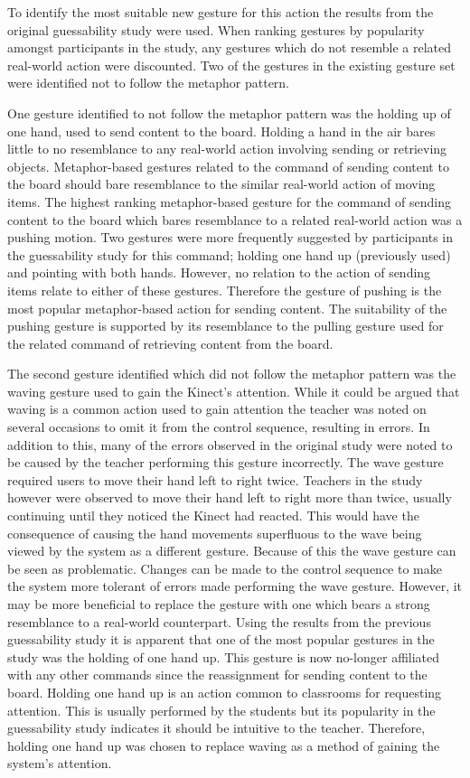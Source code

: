 \documentclass[manuscript, review, screen]{acmart}
\begin{document}
To identify the most suitable new gesture for this action the results from the original guessability study were used.
When ranking gestures by popularity amongst participants in the study, any gestures which do not resemble a related real-world action were discounted.
Two of the gestures in the existing gesture set were identified not to follow the metaphor pattern.

One gesture identified to not follow the metaphor pattern was the holding up of one hand, used to send content to the board.
Holding a hand in the air bares little to no resemblance to any real-world action involving sending or retrieving objects.
Metaphor-based gestures related to the command of sending content to the board should bare resemblance to the similar real-world action of moving items.
The highest ranking metaphor-based gesture for the command of sending content to the board which bares resemblance to a related real-world action was a pushing motion.
Two gestures were more frequently suggested by participants in the guessability study for this command; holding one hand up (previously used) and pointing with both hands.
However, no relation to the action of sending items relate to either of these gestures.
Therefore the gesture of pushing is the most popular metaphor-based action for sending content.
The suitability of the pushing gesture is supported by its resemblance to the pulling gesture used for the related command of retrieving content from the board.

The second gesture identified which did not follow the metaphor pattern was the waving gesture used to gain the Kinect's attention.
While it could be argued that waving is a common action used to gain attention the teacher was noted on several occasions to omit it from the control sequence, resulting in errors.
In addition to this, many of the errors observed in the original study were noted to be caused by the teacher performing this gesture incorrectly.
The wave gesture required users to move their hand left to right twice.
Teachers in the study however were observed to move their hand left to right more than twice, usually continuing until they noticed the Kinect had reacted.
This would have the consequence of causing the hand movements superfluous to the wave being viewed by the system as a different gesture.
Because of this the wave gesture can be seen as problematic.
Changes can be made to the control sequence to make the system more tolerant of errors made performing the wave gesture.
However, it may be more beneficial to replace the gesture with one which bears a strong resemblance to a real-world counterpart.
Using the results from the previous guessability study it is apparent that one of the most popular gestures in the study was the holding of one hand up.
This gesture is now no-longer affiliated with any other commands since the reassignment for sending content to the board.
Holding one hand up is an action common to classrooms for requesting attention.
This is usually performed by the students but its popularity in the guessability study indicates it should be intuitive to the teacher.
Therefore, holding one hand up was chosen to replace waving as a method of gaining the system's attention.
\end{document}
